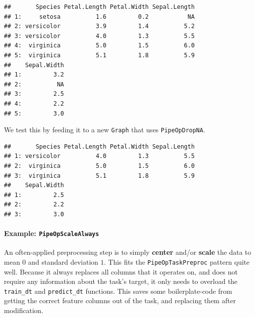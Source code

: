 \documentclass[]{article}
\newenvironment{Shaded}{\begin{snugshade}}{\end{snugshade}}
\newcommand{\DecValTok}[1]{\textcolor[rgb]{0.00,0.00,0.81}{#1}}
\newcommand{\KeywordTok}[1]{\textcolor[rgb]{0.13,0.29,0.53}{\textbf{#1}}}
\newcommand{\NormalTok}[1]{#1}
\newcommand{\OperatorTok}[1]{\textcolor[rgb]{0.81,0.36,0.00}{\textbf{#1}}}
\newcommand{\StringTok}[1]{\textcolor[rgb]{0.31,0.60,0.02}{#1}}
\let\oldparagraph\paragraph
\renewcommand{\paragraph}[1]{\oldparagraph{#1}\mbox{}}
\renewenvironment{Shaded} {\begin{snugshade}\small} {\end{snugshade}}
\begin{document}
\begin{verbatim}
##       Species Petal.Length Petal.Width Sepal.Length
## 1:     setosa          1.6         0.2           NA
## 2: versicolor          3.9         1.4          5.2
## 3: versicolor          4.0         1.3          5.5
## 4:  virginica          5.0         1.5          6.0
## 5:  virginica          5.1         1.8          5.9
##    Sepal.Width
## 1:         3.2
## 2:          NA
## 3:         2.5
## 4:         2.2
## 5:         3.0
\end{verbatim}

We test this by feeding it to a new \texttt{Graph} that uses \texttt{PipeOpDropNA}.

\begin{Shaded}
\end{Shaded}

\begin{verbatim}
##       Species Petal.Length Petal.Width Sepal.Length
## 1: versicolor          4.0         1.3          5.5
## 2:  virginica          5.0         1.5          6.0
## 3:  virginica          5.1         1.8          5.9
##    Sepal.Width
## 1:         2.5
## 2:         2.2
## 3:         3.0
\end{verbatim}

\hypertarget{example-pipeopscalealways}{%
\paragraph{\texorpdfstring{Example: \texttt{PipeOpScaleAlways}}{Example: PipeOpScaleAlways}}\label{example-pipeopscalealways}}

An often-applied preprocessing step is to simply \textbf{center} and/or \textbf{scale} the data to mean \(0\) and standard deviation \(1\).
This fits the \texttt{PipeOpTaskPreproc} pattern quite well.
Because it always replaces all columns that it operates on, and does not require any information about the task's target, it only needs to overload the \texttt{train\_dt} and \texttt{predict\_dt} functions.
This saves some boilerplate-code from getting the correct feature columns out of the task, and replacing them after modification.
\end{document}
